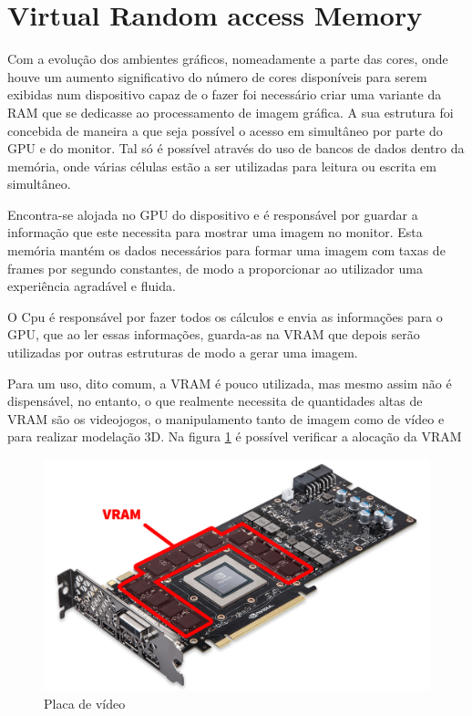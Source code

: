 \documentclass{report}
\begin{document}
\section{Virtual Random access Memory}
\par Com a evolução dos ambientes gráficos, nomeadamente a parte das cores, onde houve um aumento significativo do número de cores disponíveis para serem exibidas num dispositivo capaz de o fazer foi necessário criar uma variante da \ac{RAM} que se dedicasse ao processamento de imagem gráfica. A sua estrutura foi concebida de maneira a que seja possível o acesso em simultâneo por parte do \ac{GPU} e do monitor. Tal só é possível através do uso de bancos de dados dentro da memória, onde várias células estão a ser utilizadas para leitura ou escrita em simultâneo.

\par Encontra-se alojada no \ac{GPU} do dispositivo e é responsável por guardar a informação que este necessita para mostrar uma imagem no monitor. Esta memória mantém os dados necessários para formar uma imagem com taxas de frames por segundo constantes, de modo a proporcionar ao utilizador uma experiência agradável e fluida.

\par O \ac{Cpu} é responsável por fazer todos os cálculos e envia as informações para o \ac{GPU}, que ao ler essas informações, guarda-as na \ac{VRAM} que depois serão utilizadas por outras estruturas de modo a gerar uma imagem.
\par Para um uso, dito comum, a \ac{VRAM} é pouco utilizada, mas mesmo assim não é dispensável, no entanto, o que realmente necessita de quantidades altas de \ac{VRAM} são os videojogos, o manipulamento tanto de imagem como de vídeo e para realizar modelação 3D. Na figura \ref{foto_vram} é possível verificar a alocação da \ac{VRAM}
\begin{figure}[h]
\includegraphics[scale=0.1]{vram_152.png}
\caption{Placa de vídeo}
\label{foto_vram}
\end{figure}
\end{document}
